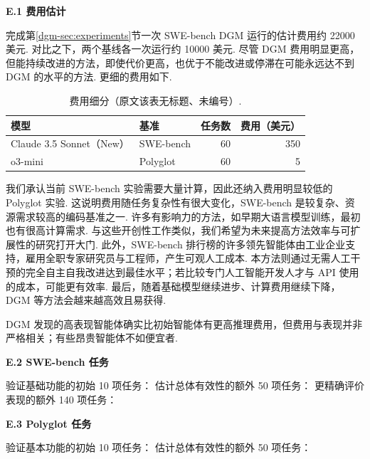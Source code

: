 \noindent\textbf{E.1 费用估计}\label{dgm-app:cost-estimate}\par
完成第\ref{dgm-sec:experiments}节一次 SWE-bench DGM 运行的估计费用约 22000 美元. 对比之下，两个基线各一次运行约 10000 美元. 尽管 DGM 费用明显更高，但能持续改进的方法，即使代价更高，也优于不能改进或停滞在可能永远达不到 DGM 的水平的方法. 更细的费用如下.
\begin{table}[ht]
\centering\caption{费用细分（原文该表无标题、未编号）.}\label{dgm-table-cost}
\begin{tabular}{llrr}\toprule 模型&基准&任务数&费用（美元）\\\midrule
Claude 3.5 Sonnet（New）&SWE-bench&60&350\\
o3-mini&Polyglot&60&5\\\bottomrule\end{tabular}
\end{table}
我们承认当前 SWE-bench 实验需要大量计算，因此还纳入费用明显较低的 Polyglot 实验. 这说明费用随任务复杂性有很大变化，SWE-bench 是较复杂、资源需求较高的编码基准之一. 许多有影响力的方法，如早期大语言模型训练，最初也有很高计算需求. 与这些开创性工作类似，我们希望为未来提高方法效率与可扩展性的研究打开大门. 此外，SWE-bench 排行榜的许多领先智能体由工业企业支持，雇用全职专家研究员与工程师，产生可观人工成本. 本方法则通过无需人工干预的完全自主自我改进达到最佳水平；若比较专门人工智能开发人才与 API 使用的成本，可能更有效率. 最后，随着基础模型继续进步、计算费用继续下降，DGM 等方法会越来越高效且易获得.

DGM 发现的高表现智能体确实比初始智能体有更高推理费用，但费用与表现并非严格相关；有些昂贵智能体不如便宜者.

\noindent\textbf{E.2 SWE-bench 任务}\label{dgm-app:swebench-tasks}\par
验证基础功能的初始 10 项任务：
估计总体有效性的额外 50 项任务：
更精确评价表现的额外 140 项任务：

\noindent\textbf{E.3 Polyglot 任务}\label{dgm-app:polyglot-tasks}\par
验证基本功能的初始 10 项任务：
估计总体有效性的额外 50 项任务：

